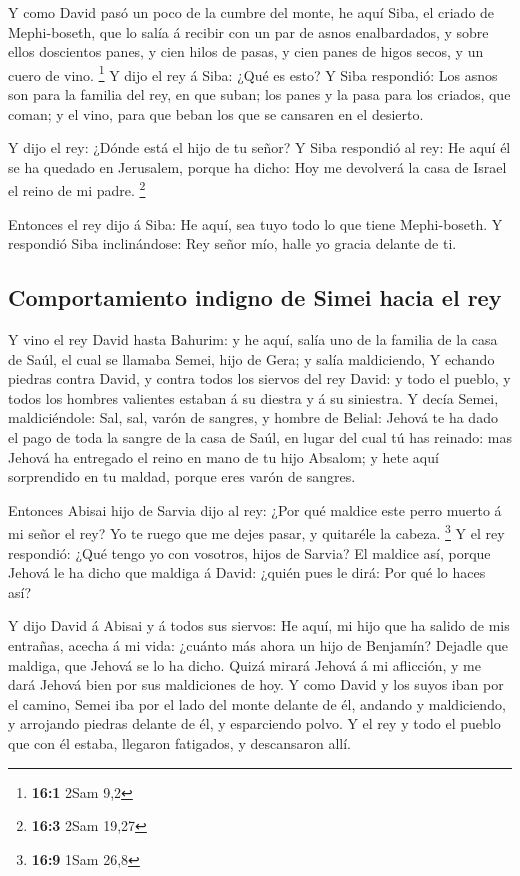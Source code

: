  Y como David pasó un poco de la cumbre del monte, he aquí
Siba, el criado de Mephi-boseth, que lo salía á recibir con un par de
asnos enalbardados, y sobre ellos doscientos panes, y cien hilos de
pasas, y cien panes de higos secos, y un cuero de vino. \footnote{\textbf{16:1}
  2Sam 9,2}  Y dijo el rey á Siba: ¿Qué es esto? Y Siba
respondió: Los asnos son para la familia del rey, en que suban; los
panes y la pasa para los criados, que coman; y el vino, para que beban
los que se cansaren en el desierto.

 Y dijo el rey: ¿Dónde está el hijo de tu señor? Y Siba
respondió al rey: He aquí él se ha quedado en Jerusalem, porque ha
dicho: Hoy me devolverá la casa de Israel el reino de mi padre.
\footnote{\textbf{16:3} 2Sam 19,27}

 Entonces el rey dijo á Siba: He aquí, sea tuyo todo lo que
tiene Mephi-boseth. Y respondió Siba inclinándose: Rey señor mío, halle
yo gracia delante de ti.

\hypertarget{comportamiento-indigno-de-simei-hacia-el-rey}{%
\subsection{Comportamiento indigno de Simei hacia el
rey}\label{comportamiento-indigno-de-simei-hacia-el-rey}}

 Y vino el rey David hasta Bahurim: y he aquí, salía uno de
la familia de la casa de Saúl, el cual se llamaba Semei, hijo de Gera; y
salía maldiciendo,  Y echando piedras contra David, y contra
todos los siervos del rey David: y todo el pueblo, y todos los hombres
valientes estaban á su diestra y á su siniestra.  Y decía
Semei, maldiciéndole: Sal, sal, varón de sangres, y hombre de Belial:
 Jehová te ha dado el pago de toda la sangre de la casa de
Saúl, en lugar del cual tú has reinado: mas Jehová ha entregado el reino
en mano de tu hijo Absalom; y hete aquí sorprendido en tu maldad, porque
eres varón de sangres.

 Entonces Abisai hijo de Sarvia dijo al rey: ¿Por qué
maldice este perro muerto á mi señor el rey? Yo te ruego que me dejes
pasar, y quitaréle la cabeza. \footnote{\textbf{16:9} 1Sam 26,8}
 Y el rey respondió: ¿Qué tengo yo con vosotros, hijos de
Sarvia? El maldice así, porque Jehová le ha dicho que maldiga á David:
¿quién pues le dirá: Por qué lo haces así?

 Y dijo David á Abisai y á todos sus siervos: He aquí, mi
hijo que ha salido de mis entrañas, acecha á mi vida: ¿cuánto más ahora
un hijo de Benjamín? Dejadle que maldiga, que Jehová se lo ha dicho.
 Quizá mirará Jehová á mi aflicción, y me dará Jehová bien
por sus maldiciones de hoy.  Y como David y los suyos iban
por el camino, Semei iba por el lado del monte delante de él, andando y
maldiciendo, y arrojando piedras delante de él, y esparciendo polvo.
 Y el rey y todo el pueblo que con él estaba, llegaron
fatigados, y descansaron allí.

